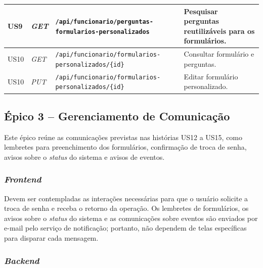 \begin{longtable}{|>{\centering\arraybackslash}p{1.2cm}|>{\centering\arraybackslash}p{1.7cm}|>{\raggedright\arraybackslash}p{5.7cm}|>{\raggedright\arraybackslash}p{5.2cm}|}
\hline
US9 & \textit{GET} & \texttt{/api/\allowbreak funcionario/\allowbreak perguntas-\allowbreak formularios-\allowbreak personalizados} & Pesquisar perguntas reutilizáveis para os formulários. \\
\hline
US10 & \textit{GET} & \texttt{/api/\allowbreak funcionario/\allowbreak formularios-personalizados/\allowbreak \{id\}} & Consultar formulário e perguntas. \\
\hline
US10 & \textit{PUT} & \texttt{/api/\allowbreak funcionario/\allowbreak formularios-personalizados/\allowbreak \{id\}} & Editar formulário personalizado. \\
\hline
\end{longtable}


\subsection{Épico 3 -- Gerenciamento de Comunicação}

Este épico reúne as comunicações previstas nas histórias US12 a US15, como lembretes para preenchimento dos formulários, confirmação de troca de senha, avisos sobre o \textit{status} do sistema e avisos de eventos.

\subsubsection{\textit{Frontend}}

Devem ser contempladas as interações necessárias para que o usuário solicite a troca de senha e receba o retorno da operação. Os lembretes de formulários, os avisos sobre o \textit{status} do sistema e as comunicações sobre eventos são enviados por e-mail pelo serviço de notificação; portanto, não dependem de telas específicas para disparar cada mensagem.

\subsubsection{\textit{Backend}}


